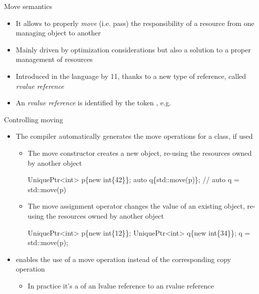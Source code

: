\begin{frame}{Move semantics}

  \begin{itemize}
  \item It allows to properly \textit{move} (i.e. pass) the responsibility of a
    resource from one managing object to another
  \item Mainly driven by optimization considerations but also a solution to
    a proper management of resources
  \item Introduced in the language by \Cpp{}11, thanks to a new type of reference,
    called \textit{rvalue reference}
  \item An \textit{rvalue reference} is identified by the token \code{\&\&}, e.g.
  \end{itemize}

\end{frame}

\begin{frame}[fragile]{Controlling moving}
  \begin{itemize}
  \item<1-> The compiler automatically generates the move operations for a class, if
    used
    \begin{itemize}
    \item The move constructor creates a \alert{new} object, \alert{re-using} the
      resources owned by another object

      \begin{codeblock}
UniquePtr<int> p\{new int\{42\}\};
auto q\{std::move(p)\}; // auto q = std::move(p)\end{codeblock}

     \item The move assignment operator changes the value of an \alert{existing}
       object, \alert{re-using} the resources owned by another object

      \begin{codeblock}
UniquePtr<int> p\{new int\{12\}\};
UniquePtr<int> q\{new int\{34\}\};
q = std::move(p);\end{codeblock}

     \end{itemize}
   \item<2->  enables the use of a move operation instead of the
     corresponding copy operation
     \begin{itemize}
     \item In practice it's a  of an lvalue reference to an
       rvalue reference
     \end{itemize}
  \end{itemize}
\end{frame}

